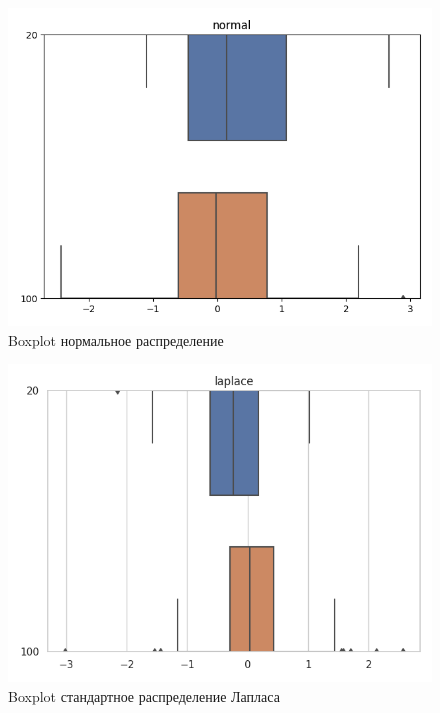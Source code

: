 \documentclass[12pt]{report}
\begin{document}
\begin{center}
\begin{figure}[H]
\caption{Boxplot нормальное распределение }
\includegraphics[scale = 0.7]{../lab_3/pic/normal.png}
\end{figure}

\begin{figure}[H]
\caption{Boxplot стандартное распределение Лапласа }
\includegraphics[scale = 0.7]{../lab_3/pic/laplace.png} 
\end{figure}


\end{center}
\end{document}
